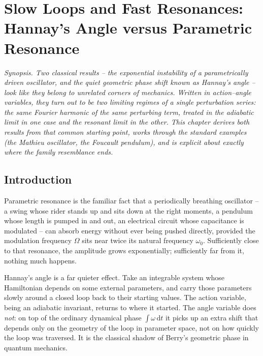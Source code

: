 \documentclass[11pt]{book}
\newcommand{\dd}{\mathrm{d}}
\begin{document}
\chapter[Hannay's Angle versus Parametric Resonance]{Slow Loops and Fast Resonances: Hannay's Angle versus Parametric Resonance}
\label{ch:hannay-parametric}

\emph{Synopsis. Two classical results -- the exponential instability of a parametrically driven
oscillator, and the quiet geometric phase shift known as Hannay's angle -- look like they belong
to unrelated corners of mechanics. Written in action--angle variables, they turn out to be two
limiting regimes of a single perturbation series: the same Fourier harmonic of the same
perturbing term, treated in the adiabatic limit in one case and the resonant limit in the other.
This chapter derives both results from that common starting point, works through the standard
examples (the Mathieu oscillator, the Foucault pendulum), and is explicit about exactly where the
family resemblance ends.}

\section{Introduction}

Parametric resonance is the familiar fact that a periodically breathing oscillator -- a swing
whose rider stands up and sits down at the right moments, a pendulum whose length is pumped in
and out, an electrical circuit whose capacitance is modulated -- can absorb energy without ever
being pushed directly, provided the modulation frequency $\Omega$ sits near twice its natural
frequency $\omega_0$. Sufficiently close to that resonance, the amplitude grows exponentially;
sufficiently far from it, nothing much happens.

Hannay's angle is a far quieter effect. Take an integrable system whose Hamiltonian depends on
some external parameters, and carry those parameters slowly around a closed loop back to their
starting values. The action variable, being an adiabatic invariant, returns to where it started.
The angle variable does \emph{not}: on top of the ordinary dynamical phase $\int \omega\,\dd t$ it
picks up an extra shift that depends only on the geometry of the loop in parameter space, not on
how quickly the loop was traversed. It is the classical shadow of Berry's geometric phase in
quantum mechanics.
\end{document}
